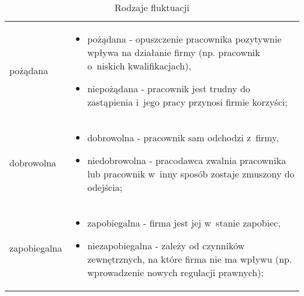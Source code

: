 \noindent\begin{minipage}{\textwidth}
             \begin{table}[H]
                 \raggedright\caption{Rodzaje fluktuacji\label{tabela:fluktuacja-rodzaje}}
                 \begin{center}
                     \begin{tabular}{|P{.15\textwidth}|P{.75\textwidth}|}

                         \hline
                          &
                          \\
                         \hline

                         pożądana &
                         \begin{itemize}
                             \item pożądana - opuszczenie pracownika pozytywnie wpływa na działanie firmy (np. pracownik o~niskich kwalifikacjach),
                             \item niepożądana - pracownik jest trudny do zastąpienia i~jego pracy przynosi firmie korzyści;
                         \end{itemize} \\
                         \hline

                         dobrowolna &
                         \begin{itemize}
                             \item dobrowolna - pracownik sam odchodzi z~firmy,
                             \item niedobrowolna - pracodawca zwalnia pracownika lub pracownik w~inny sposób zostaje zmuszony do odejścia;
                         \end{itemize} \\
                         \hline

                         zapobiegalna &
                         \begin{itemize}
                             \item zapobiegalna - firma jest jej w~stanie zapobiec,
                             \item niezapobiegalna - zależy od czynników zewnętrznych, na które firma nie ma wpływu (np. wprowadzenie nowych regulacji prawnych);
                         \end{itemize} \\
                         \hline


\end{tabular}
\end{center}
\end{table}
\end{minipage}
